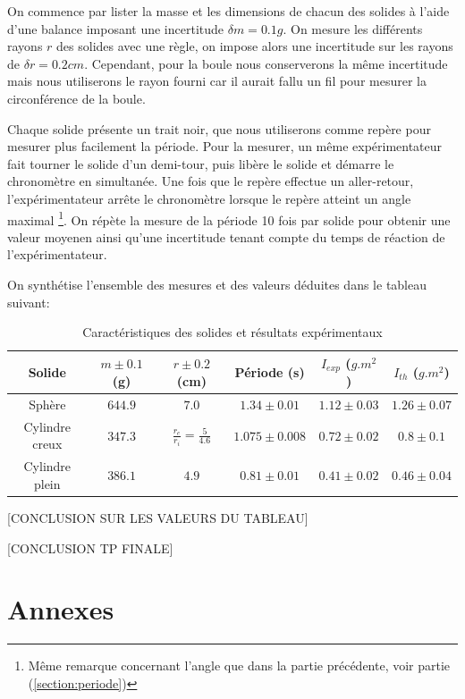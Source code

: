 \documentclass[12pt]{article}
\begin{document}
On commence par lister la masse et les dimensions de chacun des solides à l'aide d'une balance imposant une incertitude $\delta m = 0.1g$.
On mesure les différents rayons $r$ des solides avec une règle, on impose alors une incertitude sur les rayons de $\delta r = 0.2cm$. Cependant, pour la boule nous conserverons
la même incertitude mais nous utiliserons le rayon fourni car il aurait fallu un fil pour mesurer la circonférence de la boule.

Chaque solide présente un trait noir, que nous utiliserons comme repère pour mesurer plus facilement la période. Pour la mesurer,
un même expérimentateur fait tourner le solide d'un demi-tour, puis libère le solide et démarre le chronomètre en simultanée. 
Une fois que le repère effectue un aller-retour, l'expérimentateur arrête le chronomètre lorsque 
le repère atteint un angle maximal \footnote{Même remarque concernant l'angle que dans la partie précédente, voir partie (\ref{section:periode})}.
On répète la mesure de la période 10 fois par solide pour obtenir une valeur moyenen ainsi qu'une incertitude tenant compte du temps de réaction
de l'expérimentateur.

On synthétise l'ensemble des mesures et des valeurs déduites dans le tableau suivant:

\begin{table}[h!]
	\centering
	\begin{tabular}{||c c c c c c||} 
		\hline
		Solide          & $m \pm 0.1$ (g)  & $r \pm 0.2$ (cm)  & Période (s) & $I_{exp}$ ($g.m^2$)& $I_{th}$ ($g.m^2$)    \\
		\hline
        Sphère          & $644.9$ & $7.0$ & $1.34 \pm 0.01$ & $1.12 \pm 0.03$ & $1.26 \pm 0.07$ \\
        Cylindre creux  & $347.3$ & $\frac{r_e}{r_i} = \frac{5}{4.6}$ & $1.075 \pm 0.008$ & $0.72 \pm 0.02$ & $0.8 \pm 0.1$ \\
        Cylindre plein  & $386.1$ & $4.9$ & $0.81 \pm 0.01$ & $0.41 \pm 0.02$ & $0.46 \pm 0.04$ \\
		\hline
	\end{tabular}
	\caption{Caractéristiques des solides et résultats expérimentaux}
	\label{table:1}
\end{table}

[CONCLUSION SUR LES VALEURS DU TABLEAU]

[CONCLUSION TP FINALE]

\break
\section{Annexes}
\end{document}
